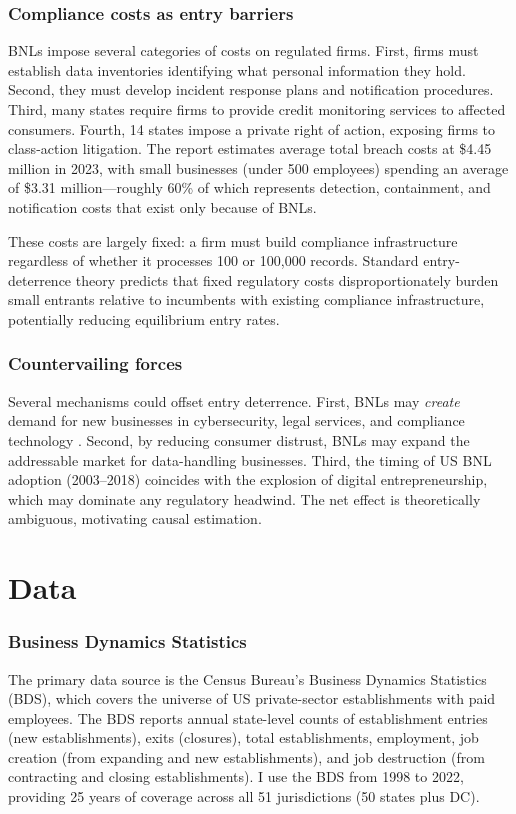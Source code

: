 \documentclass[12pt]{article}
\begin{document}
\subsubsection*{Compliance costs as entry barriers} BNLs impose several categories of costs on regulated firms. First, firms must establish data inventories identifying what personal information they hold. Second, they must develop incident response plans and notification procedures. Third, many states require firms to provide credit monitoring services to affected consumers. Fourth, 14 states impose a private right of action, exposing firms to class-action litigation. The \citet{ponemon2023cost} report estimates average total breach costs at \$4.45 million in 2023, with small businesses (under 500 employees) spending an average of \$3.31 million---roughly 60\% of which represents detection, containment, and notification costs that exist only because of BNLs.

These costs are largely fixed: a firm must build compliance infrastructure regardless of whether it processes 100 or 100,000 records. Standard entry-deterrence theory \citep{stigler1971theory} predicts that fixed regulatory costs disproportionately burden small entrants relative to incumbents with existing compliance infrastructure, potentially reducing equilibrium entry rates.

\subsubsection*{Countervailing forces} Several mechanisms could offset entry deterrence. First, BNLs may \textit{create} demand for new businesses in cybersecurity, legal services, and compliance technology \citep{greenwood2019regulatory}. Second, by reducing consumer distrust, BNLs may expand the addressable market for data-handling businesses. Third, the timing of US BNL adoption (2003--2018) coincides with the explosion of digital entrepreneurship, which may dominate any regulatory headwind. The net effect is theoretically ambiguous, motivating causal estimation.


\section{Data}

\subsubsection*{Business Dynamics Statistics} The primary data source is the Census Bureau's Business Dynamics Statistics (BDS), which covers the universe of US private-sector establishments with paid employees. The BDS reports annual state-level counts of establishment entries (new establishments), exits (closures), total establishments, employment, job creation (from expanding and new establishments), and job destruction (from contracting and closing establishments). I use the BDS from 1998 to 2022, providing 25 years of coverage across all 51 jurisdictions (50 states plus DC).
\end{document}
